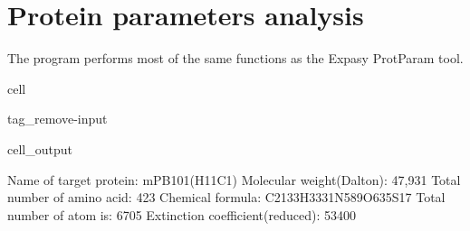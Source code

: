 \documentclass[letterpaper,10pt,english]{jupyterBook}
\begin{document}
\sphinxstepscope


\chapter{Protein parameters analysis}
\label{\detokenize{ipynb/chapter1:protein-parameters-analysis}}\label{\detokenize{ipynb/chapter1::doc}}
\sphinxAtStartPar
The program performs most of the same functions as the Expasy ProtParam tool.

\begin{sphinxuseclass}{cell}
\begin{sphinxuseclass}{tag_remove-input}\begin{sphinxVerbatimOutput}

\begin{sphinxuseclass}{cell_output}
\begin{sphinxVerbatim}[commandchars=\\\{\}]
\PYGZsh{} Name of target protein: \PYGZhy{}\PYGZhy{}\PYGZhy{}\PYGZhy{}\PYGZhy{}\PYGZhy{}\PYGZhy{}\PYGZhy{}\PYGZhy{}\PYGZhy{}\PYGZhy{}\PYGZhy{}\PYGZhy{}\PYGZhy{}\PYGZhy{}\PYGZhy{}\PYGZhy{}\PYGZhy{}\PYGZhy{}\PYGZhy{}\PYGZhy{}\PYGZhy{}\PYGZhy{}\PYGZhy{}\PYGZhy{}\PYGZhy{}mPB101(H\PYGZus{}11C1)
\PYGZsh{} Molecular weight(Dalton): \PYGZhy{}\PYGZhy{}\PYGZhy{}\PYGZhy{}\PYGZhy{}\PYGZhy{}\PYGZhy{}\PYGZhy{}\PYGZhy{}\PYGZhy{}\PYGZhy{}\PYGZhy{}\PYGZhy{}\PYGZhy{}\PYGZhy{}\PYGZhy{}\PYGZhy{}\PYGZhy{}\PYGZhy{}\PYGZhy{}\PYGZhy{}\PYGZhy{}\PYGZhy{}\PYGZhy{}\PYGZhy{}\PYGZhy{}\PYGZhy{}\PYGZhy{}\PYGZhy{}\PYGZhy{}\PYGZhy{}\PYGZhy{}47,931
\PYGZsh{} Total number of amino acid: \PYGZhy{}\PYGZhy{}\PYGZhy{}\PYGZhy{}\PYGZhy{}\PYGZhy{}\PYGZhy{}\PYGZhy{}\PYGZhy{}\PYGZhy{}\PYGZhy{}\PYGZhy{}\PYGZhy{}\PYGZhy{}\PYGZhy{}\PYGZhy{}\PYGZhy{}\PYGZhy{}\PYGZhy{}\PYGZhy{}\PYGZhy{}\PYGZhy{}\PYGZhy{}\PYGZhy{}\PYGZhy{}\PYGZhy{}\PYGZhy{}\PYGZhy{}\PYGZhy{}\PYGZhy{}\PYGZhy{}\PYGZhy{}\PYGZhy{}423
\PYGZsh{} Chemical formula: \PYGZhy{}\PYGZhy{}\PYGZhy{}\PYGZhy{}\PYGZhy{}\PYGZhy{}\PYGZhy{}\PYGZhy{}\PYGZhy{}\PYGZhy{}\PYGZhy{}\PYGZhy{}\PYGZhy{}\PYGZhy{}\PYGZhy{}\PYGZhy{}\PYGZhy{}\PYGZhy{}\PYGZhy{}\PYGZhy{}\PYGZhy{}\PYGZhy{}\PYGZhy{}\PYGZhy{}\PYGZhy{}C2133H3331N589O635S17
\PYGZsh{} Total number of atom is: \PYGZhy{}\PYGZhy{}\PYGZhy{}\PYGZhy{}\PYGZhy{}\PYGZhy{}\PYGZhy{}\PYGZhy{}\PYGZhy{}\PYGZhy{}\PYGZhy{}\PYGZhy{}\PYGZhy{}\PYGZhy{}\PYGZhy{}\PYGZhy{}\PYGZhy{}\PYGZhy{}\PYGZhy{}\PYGZhy{}\PYGZhy{}\PYGZhy{}\PYGZhy{}\PYGZhy{}\PYGZhy{}\PYGZhy{}\PYGZhy{}\PYGZhy{}\PYGZhy{}\PYGZhy{}\PYGZhy{}\PYGZhy{}\PYGZhy{}\PYGZhy{}\PYGZhy{}6705
\PYGZsh{} Extinction coefficient(reduced): \PYGZhy{}\PYGZhy{}\PYGZhy{}\PYGZhy{}\PYGZhy{}\PYGZhy{}\PYGZhy{}\PYGZhy{}\PYGZhy{}\PYGZhy{}\PYGZhy{}\PYGZhy{}\PYGZhy{}\PYGZhy{}\PYGZhy{}\PYGZhy{}\PYGZhy{}\PYGZhy{}\PYGZhy{}\PYGZhy{}\PYGZhy{}\PYGZhy{}\PYGZhy{}\PYGZhy{}\PYGZhy{}\PYGZhy{}53400

\end{sphinxVerbatim}
\end{sphinxuseclass}
\end{sphinxVerbatimOutput}
\end{sphinxuseclass}
\end{sphinxuseclass}
\end{document}
